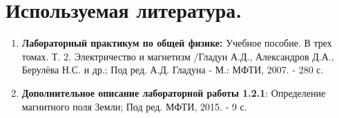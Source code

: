 \documentclass[a4paper, 12pt]{article}%
\begin{document}
\section*{Используемая литература.}
\begin{enumerate}
\item \textbf{Лабораторный практикум по общей физике:} Учебное пособие. В трех томах. Т. 2. Электричество и магнетизм /Гладун А.Д., Александров Д.А., Берулёва Н.С. и др.; Под ред. А.Д. Гладуна - М.: МФТИ, 2007. - 280 с.
\item \textbf{Дополнительное описание лабораторной работы 1.2.1}: Определение магнитного поля Земли; Под ред. МФТИ, 2015. - 9 с.
\end{enumerate}
\end{document}
